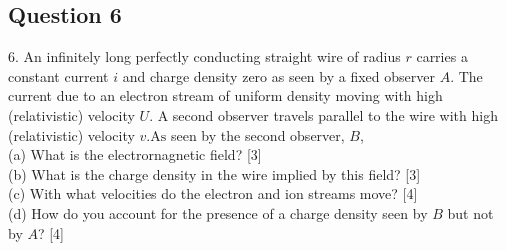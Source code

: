 \documentclass{article}
\begin{document}
\subsection{Question 6}
6. An infinitely long perfectly conducting straight wire of radius $r$ carries a constant current $i$ and charge density zero as seen by a fixed observer $A$. The current due to an electron stream of uniform density moving with high (relativistic) velocity $U$. A second observer travels parallel to the wire with high (relativistic) velocity $v . \mathrm{As}$ seen by the second observer, $B$, \\
(a) What is the electrornagnetic field? [3] \\
(b) What is the charge density in the wire implied by this field? [3] \\
(c) With what velocities do the electron and ion streams move? [4] \\
(d) How do you account for the presence of a charge density seen by $B$ but not by $A$? [4]\\
\end{document}
